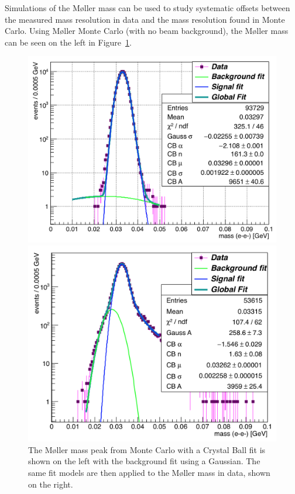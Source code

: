 Simulations of the M\o ller mass can be used to study systematic offsets between the measured mass resolution in data and the mass resolution found in Monte Carlo. Using M\o ller Monte Carlo (with no beam background), the M\o ller mass can be seen on the left in Figure~\ref{fig:moller}. 

\begin{figure}[hbt]
\begin{minipage}{0.45\textwidth}
\includegraphics[width=\textwidth]{pics/searching/mollerMassMC.png}
\end{minipage}\hfill\begin{minipage}{0.45\textwidth}
 \includegraphics[width=\textwidth]{pics/searching/mollerMass.png}
 \end{minipage}
 \caption[Fit to the M\o ller mass peak in Monte Carlo and data]{The M\o ller mass peak from Monte Carlo with a Crystal Ball fit is shown on the left with the background fit using a Gaussian. The same fit models are then applied to the M\o ller mass in data, shown on the right.}
  \label{fig:moller}
\end{figure}
